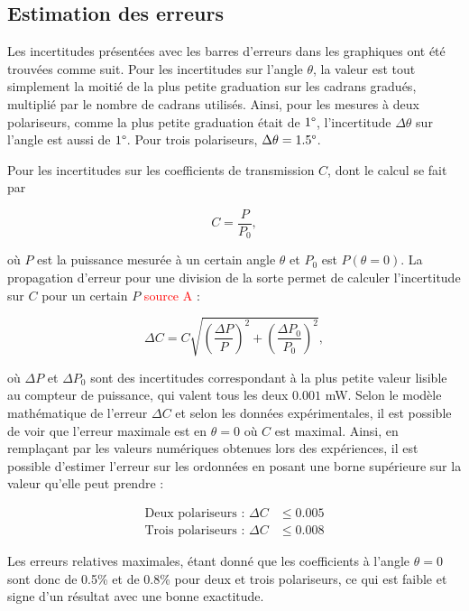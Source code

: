 \documentclass[11pt,letterpaper]{article}
\begin{document}
\subsection{Estimation des erreurs}

Les incertitudes présentées avec les barres d'erreurs dans les graphiques ont été trouvées comme suit.
Pour les incertitudes sur l'angle $\theta$, la valeur est tout simplement la moitié de la plus petite
graduation sur les cadrans gradués, multiplié par le nombre de cadrans utilisés. Ainsi, pour les
mesures à deux polariseurs, comme la plus petite graduation était de $1\degree$, l'incertitude 
$\Delta\theta$  sur l'angle est aussi de $1\degree$. Pour trois polariseurs, $\Delta\theta = 1.5\degree$. 

Pour les incertitudes sur les coefficients de transmission $C$, dont le calcul se fait par

\begin{equation}
  C = \frac{P}{P_{0}},
\end{equation}

où $P$ est la puissance mesurée à un certain angle $\theta$ et $P_{0}$ est $P\left( \theta= 0 \right)$.
La propagation d'erreur pour une division de la sorte permet de calculer l'incertitude sur $C$ pour un
certain $P$ \textcolor{red}{source A} :

\begin{equation}
  \Delta C = C\sqrt{\left( \frac{\Delta P}{P} \right)^{2} + \left( \frac{\Delta P_{0}}{P_{0}} \right)^{2}},
\end{equation}

où $\Delta P$ et $\Delta P_{0}$ sont des incertitudes correspondant à la plus petite valeur lisible au
compteur de puissance, qui valent tous les deux $0.001$ mW. Selon le modèle mathématique de 
l'erreur $\Delta C$ et selon les données expérimentales, il est possible de voir que l'erreur maximale 
est en $\theta= 0$ où $C$ est maximal. Ainsi, en remplaçant par les valeurs numériques obtenues lors 
des expériences, il est possible d'estimer l'erreur sur les ordonnées en posant une borne supérieure 
sur la valeur qu'elle peut prendre :

\begin{align*}
  \text{Deux polariseurs : }\Delta C &\leq 0.005\\ 
  \text{Trois polariseurs : }\Delta C &\leq 0.008
\end{align*}

Les erreurs relatives maximales, étant donné que les coefficients à l'angle $\theta= 0$ sont donc de 0.5\% et de 0.8\% pour deux et trois polariseurs, ce qui est faible et signe d'un résultat avec une bonne exactitude.
\end{document}
